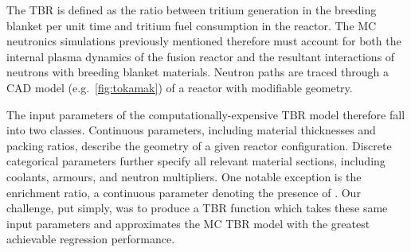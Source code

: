 The TBR is defined as the ratio between tritium generation in the breeding
blanket per unit time and tritium fuel consumption in the reactor. The MC
neutronics simulations previously mentioned therefore must account for both the
internal plasma dynamics of the fusion reactor and the resultant interactions of
neutrons with breeding blanket materials. Neutron paths are traced through a CAD
model (e.g.~\cref{fig:tokamak}) of a reactor with modifiable geometry.

The input parameters of the computationally-expensive TBR model therefore fall
into two classes. Continuous parameters, including material thicknesses and
packing ratios, describe the geometry of a given reactor configuration. Discrete
categorical parameters further specify all relevant material sections, including
coolants, armours, and neutron multipliers. One notable exception is the
enrichment ratio, a continuous parameter denoting the presence of
. Our challenge, put simply, was to produce a TBR function which
takes these same input parameters and approximates the MC TBR model with the
greatest achievable regression performance.

